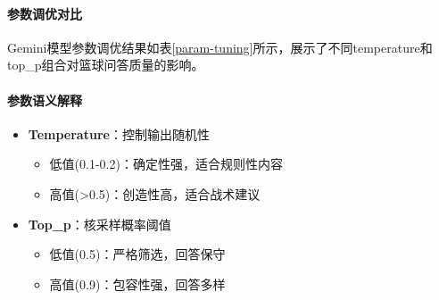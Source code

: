 \documentclass{article}
\theoremstyle{plain}
\theoremstyle{definition}
\theoremstyle{remark}
\begin{document}
\paragraph{参数调优对比}
Gemini模型参数调优结果如表\ref{param-tuning}所示，展示了不同temperature和top\_p组合对篮球问答质量的影响。
\begin{table}[t]
\caption{Gemini模型参数调优结果（篮球问答场景）}
\label{param-tuning}
\vskip 0.15in
\begin{center}
\begin{small}
\begin{sc}
\end{sc}
\end{small}
\end{center}
\vskip -0.1in
\end{table}

\paragraph{参数语义解释}
\begin{itemize}
\item \textbf{Temperature}：控制输出随机性
  \begin{itemize}
  \item 低值(0.1-0.2)：确定性强，适合规则性内容
  \item 高值(>0.5)：创造性高，适合战术建议
  \end{itemize}
  
\item \textbf{Top\_p}：核采样概率阈值
  \begin{itemize}
  \item 低值(0.5)：严格筛选，回答保守
  \item 高值(0.9)：包容性强，回答多样
  \end{itemize}
\end{itemize}
\end{document}
